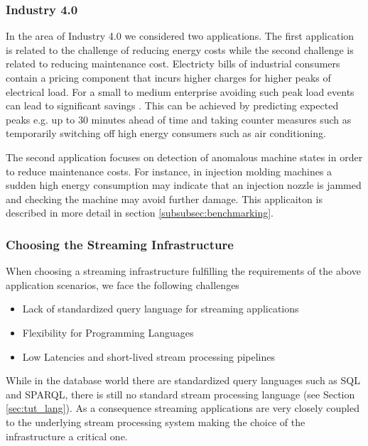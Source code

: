 \subsubsection{Industry 4.0}
In the area of Industry 4.0 we considered two applications. The first application is related to the challenge of reducing energy costs while the second challenge is related to reducing maintenance cost. Electricty bills of industrial consumers contain a pricing component that incurs higher charges for higher peaks of electrical load. For a small to medium enterprise avoiding such peak load events can lead to significant savings \cite{strohbach_and_toll_2016}. This can be achieved by predicting expected peaks e.g. up to 30 minutes ahead of time and taking counter measures such as temporarily switching off high energy consumers such as air conditioning. 

The second application focuses on detection of anomalous machine states in order to reduce maintenance costs. For instance, in injection molding machines a sudden high energy consumption may indicate that an injection nozzle is jammed and checking the machine may avoid further damage. This applicaiton is described in more detail in section \ref{subsubsec:benchmarking}.

\subsubsection{Choosing the Streaming Infrastructure}
When choosing a streaming infrastructure fulfilling the requirements of the above application scenarios, we face the following challenges

\begin{itemize}
  \item Lack of standardized query language for streaming applications 
  \item Flexibility for Programming Languages
  \item Low Latencies and short-lived stream processing pipelines
\end{itemize}

While in the database world there are standardized query languages such as SQL and SPARQL, there is still no standard stream processing language (see Section \ref{sec:tut_lang}). As a consequence streaming applications are very closely coupled to the underlying stream processing system making the choice of the infrastructure a critical one. 

